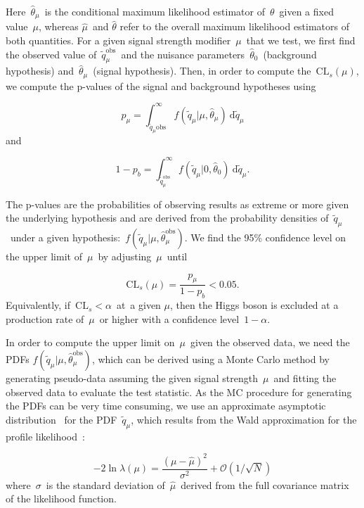 Here~$\hat{\theta}_\mu$~is the conditional maximum likelihood estimator of~$\theta$~given a fixed value~$\mu$, whereas $\hat{\mu}$~and $\hat{\theta}$ refer to the overall maximum likelihood estimators of both quantities. For a given signal strength modifier~$\mu$~that we test, we first find the observed value of~$\tilde{q}_\mu^{\mathrm{obs}}$~and the nuisance parameters~$\hat{\theta}_0$~(background hypothesis) and~$\hat{\theta}_\mu$~(signal hypothesis). Then, in order to compute the~$\mathrm{CL}_s(\mu)$, we compute the p-values of the signal and background hypotheses using

\begin{equation}
p_{\mu} = \int_{\tilde{q}_{\mu}{\mathrm{obs}}}^\infty f(\tilde{q}_{\mu} | \mu, \hat{\theta}_{\mu})\ \mathrm{d}\tilde{q}_\mu
\end{equation}
and

\begin{equation}
1 - p_b = \int_{\tilde{q}_{\mu}^{\mathrm{obs}}}^\infty f(\tilde{q}_{\mu} | 0, \hat{\theta}_0)\ \mathrm{d}\tilde{q}_{\mu}.
\end{equation}

The p-values are the probabilities of observing results as extreme or more given the underlying hypothesis and are derived from the probability densities of~$\tilde{q}_{\mu}$~under a given hypothesis:~$f(\tilde{q}_\mu | \mu, \hat{\theta}_\mu^{\mathrm{obs}})$. We find the 95\% confidence level on the upper limit of~$\mu$~by adjusting~$\mu$~until

\begin{equation}
\mathrm{CL}_s(\mu) = \frac{p_\mu}{1 - p_b} < 0.05.
\end{equation}
Equivalently, if~$\mathrm{CL}_s < \alpha$~at~a given $\mu$, then the Higgs boson is excluded at a production rate of~$\mu$~or higher with a confidence level~$1 - \alpha$.

In order to compute the upper limit on~$\mu$~given the observed data, we need the PDFs $f(\tilde{q}_\mu | \mu, \hat{\theta}_\mu^{\mathrm{obs}})$, which can be derived using a Monte Carlo method by generating pseudo-data assuming the given signal strength~$\mu$~and fitting the observed data to evaluate the test statistic. As the MC procedure for generating the PDFs can be very time consuming, we use an approximate asymptotic distribution~\cite{Cowan:2010js} for the PDF~$\tilde{q}_\mu$, which results from the Wald approximation for the profile likelihood~\cite{wald1943tests}:

\begin{equation}
-2 \ln{\lambda(\mu)} = \frac{(\mu - \hat{\mu})^2}{\sigma^2}+ \mathcal{O}(1/\sqrt{N})
\end{equation}
where~$\sigma$~is the standard deviation of~$\hat{\mu}$~derived from the full covariance matrix of the likelihood function.

